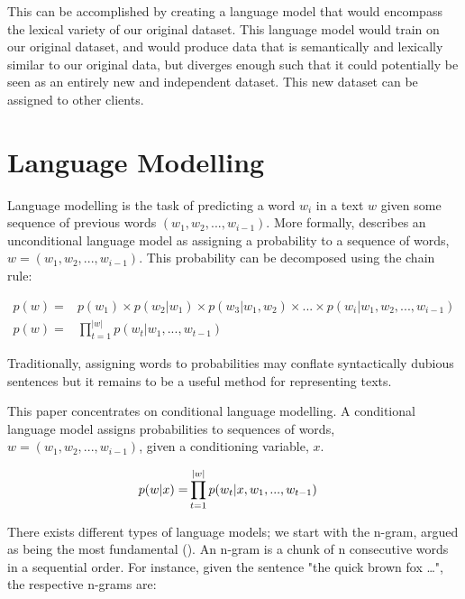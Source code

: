 \documentclass[12pt,twoside]{report}
\begin{document}
This can be accomplished by creating a language model that would encompass the lexical variety of our original dataset. This language model would train on our original dataset, and would produce data that is semantically and lexically similar to our original data, but diverges enough such that it could potentially be seen as an entirely new and independent dataset. This new dataset can be assigned to other clients.


\section{Language Modelling}

Language modelling is the task of predicting a word $w_i$ in a text $w$ given some sequence of previous words $(w_1, w_2, ..., w_{i-1})$. More formally, \cite{dyer_conditional_2017} describes an unconditional language model as assigning a probability to a sequence of words,  $w = (w_1, w_2, ..., w_{i-1})$. This probability can be decomposed using the chain rule:

\begin{align}
p(w) = &{} p(w_1) \times p(w_2|w_1) \times p(w_3|w_1, w_2) \times ... \times p(w_i|w_1, w_2, ..., w_{i-1}) \\
p(w) = &{} \prod^{|w|}_{t=1}p(w_t|w_1, ..., w_{t-1})
\end{align}

Traditionally, assigning words to probabilities may conflate syntactically dubious sentences but it remains to be a useful method for representing texts.  

This paper concentrates on conditional language modelling. A conditional language model assigns probabilities to sequences of words, $w = (w_1, w_2, ..., w_{i-1})$, given a conditioning variable, $x$. 

\begin{align}
	p(\boldmath{w}|x) = &{} \prod^{|w|}_{t=1}p(w_t|x,w_1, ..., w_{t-1})
\end{align}

There exists different types of language models; we start with the n-gram, argued as being the most fundamental (\cite{le_recurrent_2018}). An n-gram is a chunk of n consecutive words in a sequential order. For instance, given the sentence "the quick brown fox \ldots", the respective n-grams are: 
\end{document}
